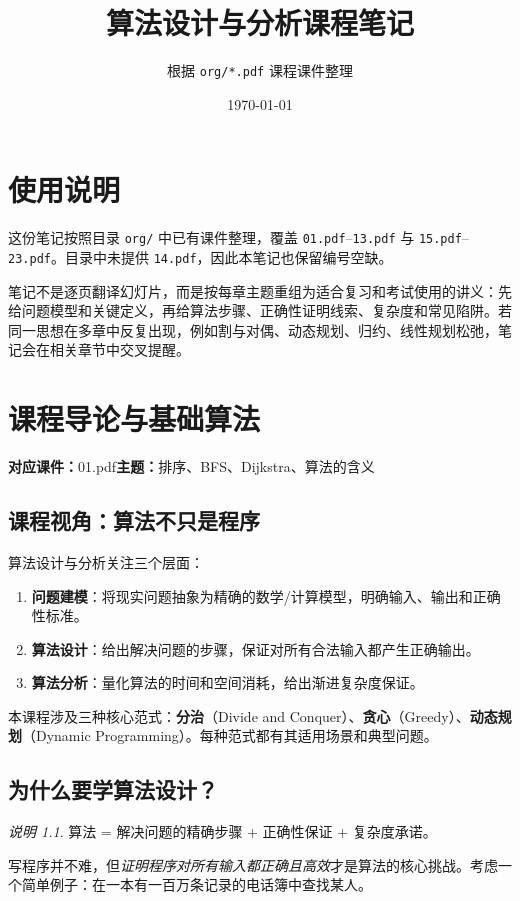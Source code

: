 \documentclass[UTF8,openany,12pt]{ctexbook}
\title{算法设计与分析课程笔记}
\author{根据 \texttt{org/*.pdf} 课程课件整理}
\date{\today}
\theoremstyle{remark}
\newtheorem{remark}{说明}[chapter]
\newcommand{\lecture}[3]{
  \chapter{#2}
  \noindent\textbf{对应课件：}#1\hfill\textbf{主题：}#3
  \vspace{0.6em}
}
\begin{document}
\frontmatter
\maketitle
\tableofcontents

\chapter*{使用说明}
这份笔记按照目录 \texttt{org/} 中已有课件整理，覆盖 \texttt{01.pdf}--\texttt{13.pdf} 与
\texttt{15.pdf}--\texttt{23.pdf}。目录中未提供 \texttt{14.pdf}，因此本笔记也保留编号空缺。

笔记不是逐页翻译幻灯片，而是按每章主题重组为适合复习和考试使用的讲义：先给问题模型和关键定义，再给算法步骤、正确性证明线索、复杂度和常见陷阱。若同一思想在多章中反复出现，例如割与对偶、动态规划、归约、线性规划松弛，笔记会在相关章节中交叉提醒。

\mainmatter

\lecture{01.pdf}{课程导论与基础算法}{排序、BFS、Dijkstra、算法的含义}

\section{课程视角：算法不只是程序}

算法设计与分析关注三个层面：
\begin{enumerate}
  \item \textbf{问题建模}：将现实问题抽象为精确的数学/计算模型，明确输入、输出和正确性标准。
  \item \textbf{算法设计}：给出解决问题的步骤，保证对所有合法输入都产生正确输出。
  \item \textbf{算法分析}：量化算法的时间和空间消耗，给出渐进复杂度保证。
\end{enumerate}

本课程涉及三种核心范式：\textbf{分治}（Divide and Conquer）、\textbf{贪心}（Greedy）、\textbf{动态规划}（Dynamic Programming）。每种范式都有其适用场景和典型问题。

\section{为什么要学算法设计？}

\begin{remark}
算法 = 解决问题的精确步骤 + 正确性保证 + 复杂度承诺。
\end{remark}

写程序并不难，但\emph{证明程序对所有输入都正确且高效}才是算法的核心挑战。考虑一个简单例子：在一本有一百万条记录的电话簿中查找某人。
\end{document}
